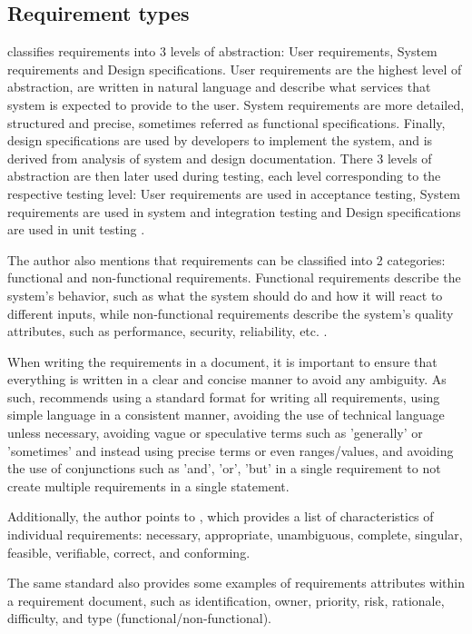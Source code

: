 \subsection{Requirement types}

\textcite[4]{requirements} classifies requirements into 3 levels of abstraction: User requirements, System requirements and Design specifications. User requirements are the highest level of abstraction, are written in natural language and describe what services that system is expected to provide to the user. System requirements are more detailed, structured and precise, sometimes referred as functional specifications. Finally, design specifications are used by developers to implement the system, and is derived from analysis of system and design documentation. There 3 levels of abstraction are then later used during testing, each level corresponding to the respective testing level: User requirements are used in acceptance testing, System requirements are used in system and integration testing and Design specifications are used in unit testing \parencite[4]{requirements}.

The author also mentions that requirements can be classified into 2 categories: functional and non-functional requirements. Functional requirements describe the system's behavior, such as what the system should do and how it will react to different inputs, while non-functional requirements describe the system's quality attributes, such as performance, security, reliability, etc. \parencite[6]{requirements}.

When writing the requirements in a document, it is important to ensure that everything is written in a clear and concise manner to avoid any ambiguity. As such, \textcite[112]{requirements} recommends using a standard format for writing all requirements, using simple language in a consistent manner, avoiding the use of technical language unless necessary, avoiding vague or speculative terms such as 'generally' or 'sometimes' and instead using precise terms or even ranges/values, and avoiding the use of conjunctions such as 'and', 'or', 'but' in a single requirement to not create multiple requirements in a single statement.

Additionally, the author points to \textcite{requirements2}, which provides a list of characteristics of individual requirements: necessary, appropriate, unambiguous, complete, singular, feasible, verifiable, correct, and conforming.

The same standard also provides some examples of requirements attributes within a requirement document, such as identification, owner, priority, risk, rationale, difficulty, and type (functional/non-functional).

